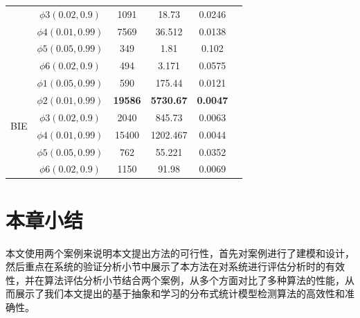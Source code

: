 \begin{table}
\begin{tabular}{c c c c c c}
                & $\phi3(0.02,0.9)$ &  1091& 18.73& 0.0246\\ 
                & $\phi4(0.01,0.99)$ &  7569&  36.512 &  0.0138\\ 
                & $\phi5(0.05,0.99)$ &  349&  1.81&  0.102\\ 
                & $\phi6(0.02,0.9)$ &  494& 3.171& 0.0575\\     
        \hline 
         \multirow{6}{1.5cm}{BIE}  
                & $\phi1(0.05,0.99)$ &  590&  175.44&  0.0121\\ 
                & $\phi2(0.01,0.99)$ &  \textbf{19586}&  \textbf{5730.67} &  \textbf{0.0047} \\ 
                & $\phi3(0.02,0.9)$ &  2040& 845.73& 0.0063\\ 
                & $\phi4(0.01,0.99)$ & 15400&  1202.467 &  0.0044\\ 
                & $\phi5(0.05,0.99)$ &  762&  55.221&  0.0352\\ 
                & $\phi6(0.02,0.9)$ &  1150& 91.98& 0.0069\\      
        \hline 
\end{tabular} 
\label{ta-rs}
\end{table}

\section{本章小结}
本文使用两个案例来说明本文提出方法的可行性，首先对案例进行了建模和设计，然后重点在系统的验证分析小节中展示了本方法在对系统进行评估分析时的有效性，并在算法评估分析小节结合两个案例，从多个方面对比了多种算法的性能，从而展示了我们本文提出的基于抽象和学习的分布式统计模型检测算法的高效性和准确性。
